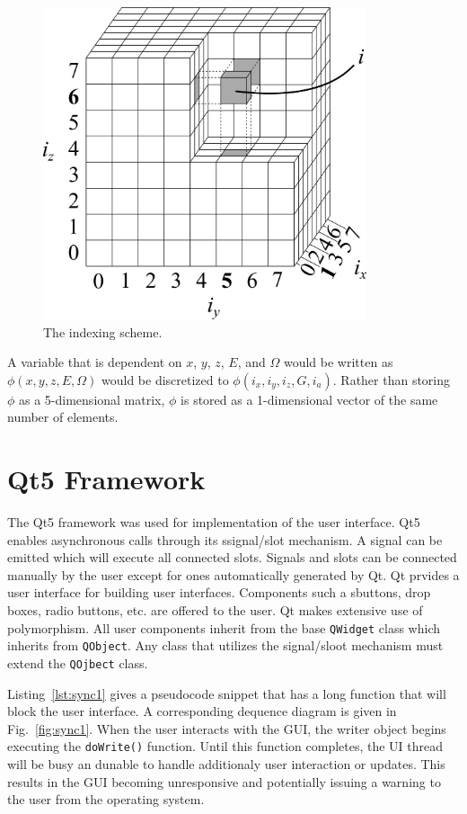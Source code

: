 \begin{figure}[tb]
  \begin{center}
   \includegraphics[width=3.75in]{figs/indx_ex}
  \end{center}
  \caption{The indexing scheme.}
\label{fig:indx_ex}
\end{figure}

A variable that is dependent on $x$, $y$, $z$, $E$, and $\Omega$ would be written as $\phi(x, y, z, E, \Omega)$ would be discretized to $\phi(i_x, i_y, i_z, G, i_a)$. Rather than storing $\phi$ as a 5-dimensional matrix, $\phi$ is stored as a 1-dimensional vector of the same number of elements.

\section{Qt5 Framework}
The Qt5 framework was used for implementation of the user interface. Qt5 enables asynchronous calls through its ssignal/slot mechanism. A signal can be emitted which will execute all connected slots. Signals and slots can be connected manually by the user except for ones automatically generated by Qt. Qt prvides a user interface for building user interfaces. Components such a sbuttons, drop boxes, radio buttons, etc. are offered to the user. Qt makes extensive use of polymorphism. All user components inherit from the base \texttt{QWidget} class which inherits from \texttt{QObject}. Any class that utilizes the signal/sloot mechanism must extend the \texttt{QOjbect} class.

Listing~\ref{lst:sync1} gives a pseudocode snippet that has a long function that will block the user interface. A corresponding dequence diagram is given in Fig.~\ref{fig:sync1}. When the user interacts with the GUI, the writer object begins executing the \texttt{doWrite()} function. Until this function completes, the UI thread will be busy an dunable to handle additionaly user interaction or updates. This results in the GUI becoming unresponsive and potentially issuing a warning to the user from the operating system.

